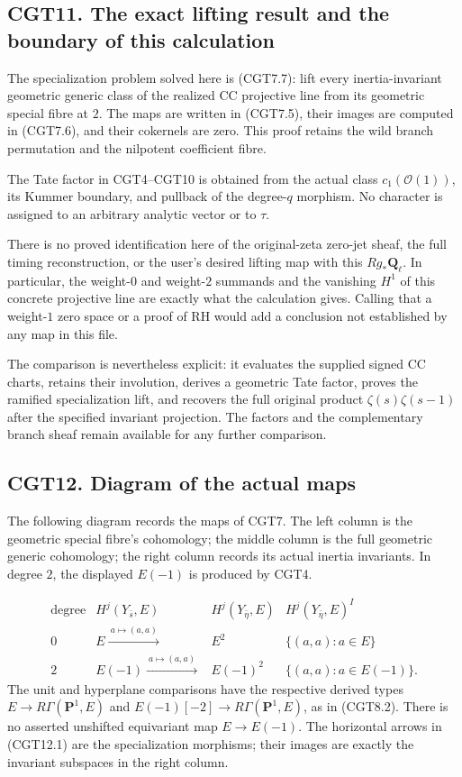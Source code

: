 \subsection{CGT11. The exact lifting result and the boundary of this
calculation}\label{cgt11.-the-exact-lifting-result-and-the-boundary-of-this-calculation}

The specialization problem solved here is (CGT7.7): lift every
inertia-invariant geometric generic class of the realized CC projective
line from its geometric special fibre at \(2\). The maps are written in
(CGT7.5), their images are computed in (CGT7.6), and their cokernels are
zero. This proof retains the wild branch permutation and the nilpotent
coefficient fibre.

The Tate factor in CGT4--CGT10 is obtained from the actual class
\(c_1(\mathcal O(1))\), its Kummer boundary, and pullback of the
degree-\(q\) morphism. No character is assigned to an arbitrary analytic
vector or to \(\tau\).

There is no proved identification here of the original-zeta zero-jet
sheaf, the full timing reconstruction, or the user's desired lifting map
with this \(Rg_*\mathbf Q_\ell\). In particular, the weight-\(0\) and
weight-\(2\) summands and the vanishing \(H^1\) of this concrete
projective line are exactly what the calculation gives. Calling that a
weight-\(1\) zero space or a proof of RH would add a conclusion not
established by any map in this file.

The comparison is nevertheless explicit: it evaluates the supplied
signed CC charts, retains their involution, derives a geometric Tate
factor, proves the ramified specialization lift, and recovers the full
original product \(\zeta(s)\zeta(s-1)\) after the specified invariant
projection. The factors and the complementary branch sheaf remain
available for any further comparison.

\subsection{CGT12. Diagram of the actual
maps}\label{cgt12.-diagram-of-the-actual-maps}

The following diagram records the maps of CGT7. The left column is the
geometric special fibre's cohomology; the middle column is the full
geometric generic cohomology; the right column records its actual
inertia invariants. In degree \(2\), the displayed \(E(-1)\) is produced
by CGT4.

\[
\begin{array}{c|ccc}
\text{degree}&H^j(Y_{\bar s},E)&H^j(Y_{\bar\eta},E)&
H^j(Y_{\bar\eta},E)^I\\ \hline
0&E\xrightarrow{\ a\mapsto(a,a)\ }&
E^2&\{(a,a):a\in E\}\\[1mm]
2&E(-1)\xrightarrow{\ a\mapsto(a,a)\ }&
E(-1)^2&\{(a,a):a\in E(-1)\}.
\end{array}
\tag{CGT12.1}
\] The unit and hyperplane comparisons have the respective derived types
\(E\to R\Gamma(\mathbf P^1,E)\) and
\(E(-1)[-2]\to R\Gamma(\mathbf P^1,E)\), as in (CGT8.2). There is no
asserted unshifted equivariant map \(E\to E(-1)\). The horizontal arrows
in (CGT12.1) are the specialization morphisms; their images are exactly
the invariant subspaces in the right column.
